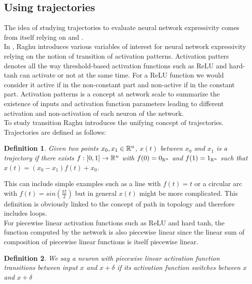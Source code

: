 \documentclass[12pt, a4paper]{article}
\newtheorem{definition}{Definition}
\begin{document}
\subsection{Using trajectories}
\label{sec:using_trajectories}

The idea of studying trajectories to evaluate neural network expressivity comes from \cite{raghu_expressive_2017} itself relying on \cite{poole_exponential_2016} and \cite{pascanu_number_2014}.\\

In \cite{raghu_expressive_2017}, Raghu introduces various variables of interest for neural network expressivity relying on the notion of transition of activation patterns. Activation patters denotes all the way threshold-based activation functions such as ReLU and hard-tanh can activate or not at the same time. For a ReLU function we would consider it active if in the non-constant part and non-active if in the constant part. Activation patterns is a concept at network scale to summarize the existence of inputs and activation function parameters leading to different activation and non-activation of each neuron of the network.\\

To study transition Raghu introduces the unifying concept of trajectories. Trajectories are defined as follows:

\begin{definition}
  Given two points $x_0, x_1 \in \mathbb{R}^n$, $x(t)$ between $x_0$ and $x_1$ is a trajectory if there exists $f: [0,1] \to \mathbb{R}^n$ with $f(0) = 0_{\mathbb{R}^n}$ and $f(1) = 1_{\mathbb{R}^n}$ such that $x(t) = (x_0-x_1)f(t) + x_0$. 
  \label{def:trajectories}
\end{definition}

This can include simple examples such as a line with $f(t) = t$ or a circular arc with $f(t) = sin(\frac{\pi t}{2})$ but in general $x(t)$ might be more complicated. This definition is obviously linked to the concept of path in topology and therefore includes loops.\\

For piecewise linear activation functions such as ReLU and hard tanh, the function computed by the network is also piecewise linear since the linear sum of composition of piecewise linear functions is itself piecewise linear.

\begin{definition}
  We say a neuron with piecewise linear activation function transitions between input $x$ and $x+\delta$ if its activation function switches between $x$ and $x+\delta$
\end{definition}
\end{document}
